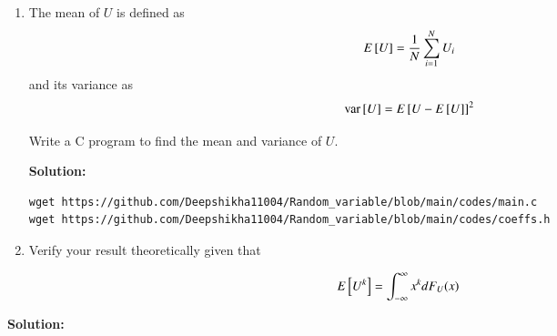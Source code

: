 \documentclass[journal,12pt,twocolumn]{IEEEtran}
\renewcommand\thesection{\arabic{section}}
\begin{document}
\begin{enumerate}[label=\thesection.\arabic*
,ref=\thesection.\theenumi]
\textbf{Solution:}
\begin{align}
   f_u(x)=
  \begin{cases}
  1 & 0<x<1\\
  0 & \text otherwise
  \end{cases}
\end{align}
For $x\le 0$,
\begin{align}
      F_u(x)&=\int_{-\infty}^{0} 0 dx \\
        &=0
\end{align}

For $0<x<1$,
\begin{align}
      F_u(x)&=\int_{0}^{x} 1 dx \\
        &=x
\end{align}

For $x \ge 1$,
\begin{align}
      F_u(x)&=\int_{1}^{\infty} 0 dx \\
        &=0
\end{align}

\item
The mean of $U$ is defined as
%
\begin{equation}
E{}\left[U\right] = \frac{1}{N}\sum_{i=1}^{N}U_i
\end{equation}
%
and its variance as
%
\begin{equation}
\text{var}{}\left[U\right] = E{}\left[U- E{}\left[U\right]\right]^2 
\end{equation}

Write a C program to  find the mean and variance of $U$. 


\textbf{Solution:}
\begin{lstlisting}
wget https://github.com/Deepshikha11004/Random_variable/blob/main/codes/main.c
wget https://github.com/Deepshikha11004/Random_variable/blob/main/codes/coeffs.h
\end{lstlisting}



\item Verify your result theoretically given that
\end{enumerate}

\begin{equation}
E{}\left[U^k\right] = \int_{-\infty}^{\infty}x^kdF_{U}(x)
\end{equation}


\textbf{Solution:}
\end{document}
